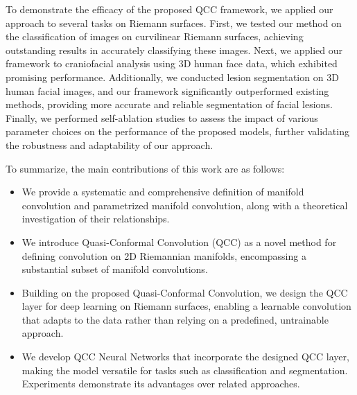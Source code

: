 
To demonstrate the efficacy of the proposed QCC framework, we applied our approach to several tasks on Riemann surfaces. First, we tested our method on the classification of images on curvilinear Riemann surfaces, achieving outstanding results in accurately classifying these images. Next, we applied our framework to craniofacial analysis using 3D human face data, which exhibited promising performance. Additionally, we conducted lesion segmentation on 3D human facial images, and our framework significantly outperformed existing methods, providing more accurate and reliable segmentation of facial lesions. Finally, we performed self-ablation studies to assess the impact of various parameter choices on the performance of the proposed models, further validating the robustness and adaptability of our approach.

To summarize, the main contributions of this work are as follows:
\begin{itemize}
    \item We provide a systematic and comprehensive definition of manifold convolution and parametrized manifold convolution, along with a theoretical investigation of their relationships.
    \item We introduce Quasi-Conformal Convolution (QCC) as a novel method for defining convolution on 2D Riemannian manifolds, encompassing a substantial subset of manifold convolutions.
    \item Building on the proposed Quasi-Conformal Convolution, we design the QCC layer for deep learning on Riemann surfaces, enabling a learnable convolution that adapts to the data rather than relying on a predefined, untrainable approach.
    \item We develop QCC Neural Networks that incorporate the designed QCC layer, making the model versatile for tasks such as classification and segmentation. Experiments demonstrate its advantages over related approaches.
\end{itemize}

